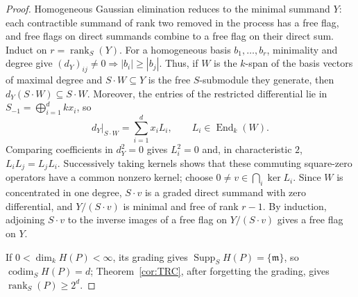 \documentclass[11pt,reqno]{amsart}
\theoremstyle{plain}
\theoremstyle{definition}
\DeclareMathOperator{\rank}{rank}
\DeclareMathOperator{\codim}{codim}
\DeclareMathOperator{\Supp}{Supp}
\begin{document}
\begin{proof}
Homogeneous Gaussian elimination reduces to the minimal summand $Y$: each contractible summand of
rank two removed in the process has a free flag, and free flags on direct summands combine to a free
flag on their direct sum.  Induct on $r=\rank_S(Y)$.  For a homogeneous basis
$b_1,\dots,b_r$, minimality and degree give
$(d_Y)_{ij}\ne0\Rightarrow |b_i|\ge|b_j|$.  Thus, if $W$ is the $k$-span of the basis vectors of
maximal degree and $S\cdot W\subseteq Y$ is the free $S$-submodule they generate, then
$d_Y(S\cdot W)\subseteq S\cdot W$.  Moreover, the entries of the restricted differential lie in
$S_{-1}=\bigoplus_{i=1}^d kx_i$, so
\[
d_Y|_{S\cdot W}=\sum_{i=1}^d x_iL_i,\qquad L_i\in\operatorname{End}_k(W).
\]
Comparing coefficients in $d_Y^2=0$ gives $L_i^2=0$ and, in characteristic $2$,
$L_iL_j=L_jL_i$.  Successively taking kernels shows that these commuting square-zero operators have
a common nonzero kernel; choose $0\ne v\in\bigcap_i\ker L_i$.  Since $W$ is concentrated in one
degree, $S\cdot v$ is a graded direct summand with zero differential, and $Y/(S\cdot v)$ is minimal
and free of rank $r-1$.  By induction, adjoining $S\cdot v$ to the inverse images of a free flag on
$Y/(S\cdot v)$ gives a free flag on $Y$.

If $0<\dim_kH(P)<\infty$, its grading gives $\Supp_SH(P)=\{\mathfrak m\}$, so
$\codim_SH(P)=d$; Theorem~\ref{cor:TRC}, after forgetting the grading, gives
$\rank_S(P)\ge2^d$.
\end{proof}
\end{document}
